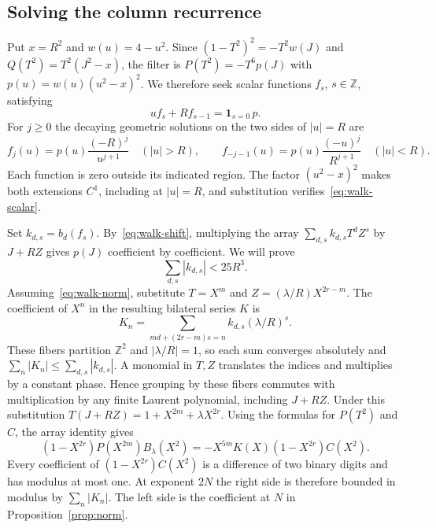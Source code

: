 \documentclass[11pt,reqno]{amsart}
\numberwithin{equation}{section}
\newcommand{\Z}{\mathbb Z}
\begin{document}
\subsection{Solving the column recurrence}
Put $x=R^2$ and $w(u)=4-u^2$. Since $(1-T^2)^2=-T^2w(J)$ and $Q(T^2)=T^2(J^2-x)$, the filter is $P(T^2)=-T^6p(J)$ with $p(u)=w(u)(u^2-x)^2$. We therefore seek scalar functions $f_s$, $s\in\Z$, satisfying
\begin{equation}\label{eq:walk-scalar}
 u f_s+R f_{s-1}=\mathbf 1_{s=0}\,p .
\end{equation}
For $j\ge0$ the decaying geometric solutions on the two sides of $|u|=R$ are
\[
 f_j(u)=p(u)\frac{(-R)^j}{u^{j+1}}\quad(|u|>R),\qquad
 f_{-j-1}(u)=p(u)\frac{(-u)^j}{R^{j+1}}\quad(|u|<R).
\]
Each function is zero outside its indicated region. The factor $(u^2-x)^2$ makes both extensions $C^1$, including at $|u|=R$, and substitution verifies~\eqref{eq:walk-scalar}.

Set $k_{d,s}=b_d(f_s)$. By~\eqref{eq:walk-shift}, multiplying the array $\sum_{d,s}k_{d,s}T^d Z^s$ by $J+RZ$ gives $p(J)$ coefficient by coefficient. We will prove
\begin{equation}\label{eq:walk-norm}
 \sum_{d,s}|k_{d,s}|<25R^3.
\end{equation}
Assuming~\eqref{eq:walk-norm}, substitute $T=X^m$ and $Z=(\lambda/R)X^{2r-m}$. The coefficient of $X^n$ in the resulting bilateral series $K$ is
\[
 K_n=\sum_{md+(2r-m)s=n} k_{d,s}(\lambda/R)^s .
\]
These fibers partition $\Z^2$ and $|\lambda/R|=1$, so each sum converges absolutely and $\sum_n|K_n|\le\sum_{d,s}|k_{d,s}|$. A monomial in $T,Z$ translates the indices and multiplies by a constant phase. Hence grouping by these fibers commutes with multiplication by any finite Laurent polynomial, including $J+RZ$. Under this substitution $T(J+RZ)=1+X^{2m}+\lambda X^{2r}$. Using the formulas for $P(T^2)$ and $C$, the array identity gives
\[
 (1-X^{2r})P(X^{2m})B_\lambda(X^2)
       =-X^{5m}K(X)(1-X^{2r})C(X^2).
\]
Every coefficient of $(1-X^{2r})C(X^2)$ is a difference of two binary digits and has modulus at most one. At exponent $2N$ the right side is therefore bounded in modulus by $\sum_n|K_n|$. The left side is the coefficient at $N$ in Proposition~\ref{prop:norm}.
\end{document}

